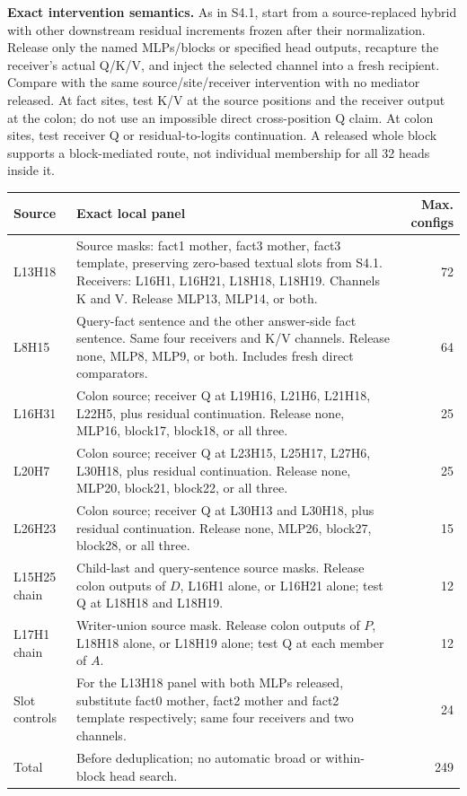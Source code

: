 \textbf{Exact intervention semantics.} As in S4.1, start from a source-replaced hybrid with other downstream residual increments frozen after their normalization. Release only the named MLPs/blocks or specified head outputs, recapture the receiver's actual Q/K/V, and inject the selected channel into a fresh recipient. Compare with the same source/site/receiver intervention with no mediator released. At fact sites, test K/V at the source positions and the receiver output at the colon; do not use an impossible direct cross-position Q claim. At colon sites, test receiver Q or residual-to-logits continuation. A released whole block supports a block-mediated route, not individual membership for all 32 heads inside it.

\begin{longtable}{p{.15\linewidth}p{.60\linewidth}r}
\toprule Source & Exact local panel & Max. configs\\\midrule\endhead
L13H18 & Source masks: fact1 mother, fact3 mother, fact3 template, preserving zero-based textual slots from S4.1. Receivers: L16H1, L16H21, L18H18, L18H19. Channels K and V. Release MLP13, MLP14, or both. & 72\\
L8H15 & Query-fact sentence and the other answer-side fact sentence. Same four receivers and K/V channels. Release none, MLP8, MLP9, or both. Includes fresh direct comparators. & 64\\
L16H31 & Colon source; receiver Q at L19H16, L21H6, L21H18, L22H5, plus residual continuation. Release none, MLP16, block17, block18, or all three. & 25\\
L20H7 & Colon source; receiver Q at L23H15, L25H17, L27H6, L30H18, plus residual continuation. Release none, MLP20, block21, block22, or all three. & 25\\
L26H23 & Colon source; receiver Q at L30H13 and L30H18, plus residual continuation. Release none, MLP26, block27, block28, or all three. & 15\\
L15H25 chain & Child-last and query-sentence source masks. Release colon outputs of $D$, L16H1 alone, or L16H21 alone; test Q at L18H18 and L18H19. & 12\\
L17H1 chain & Writer-union source mask. Release colon outputs of $P$, L18H18 alone, or L18H19 alone; test Q at each member of $A$. & 12\\
Slot controls & For the L13H18 panel with both MLPs released, substitute fact0 mother, fact2 mother and fact2 template respectively; same four receivers and two channels. & 24\\\midrule
Total & Before deduplication; no automatic broad or within-block head search. & 249\\\bottomrule
\end{longtable}

